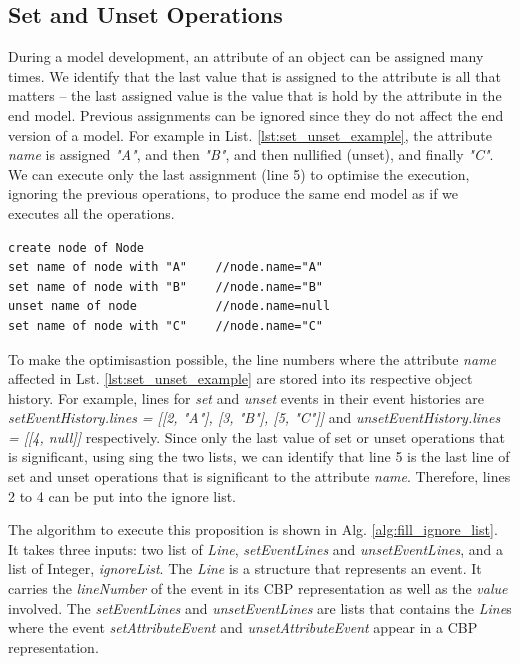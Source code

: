 \documentclass[sigconf]{acmart}
\begin{document}
\subsection{Set and Unset Operations}
\label{subsec:set_and_unset_operations}
During a model development, an attribute of an object can be assigned many times. We identify that the last value that is assigned to the attribute is all that matters -- the last assigned value is the value that is hold by the attribute in the end model. Previous assignments can be ignored since they do not affect the end version of a model. For example in List. \ref{lst:set_unset_example}, the attribute \emph{name} is assigned \emph{"A"}, and then \emph{"B"}, and then nullified (unset), and finally \emph{"C"}. We can execute only the last assignment (line 5) to optimise the execution, ignoring the previous operations, to produce the same end model as if we executes all the operations. 

\begin{lstlisting}[style=eol,caption={Example of CBP representation of \emph{name} attribute assignments.},label=lst:set_unset_example]
create node of Node
set name of node with "A"    //node.name="A"    
set name of node with "B"    //node.name="B"
unset name of node           //node.name=null
set name of node with "C"    //node.name="C"
\end{lstlisting}

To make the optimisastion possible, the line numbers where the attribute \emph{name} affected in Lst. \ref{lst:set_unset_example} are stored into its respective object history.  For example, lines for \emph{set} and \emph{unset} events in their event histories are \emph{setEventHistory.lines = [[2, "A"], [3, "B"], [5, "C"]]} and \emph{unsetEventHistory.lines = [[4, null]]} respectively. Since only the last value of set or unset operations that is significant, using sing the two lists, we can identify that line 5 is the last line of set and unset operations that is significant to the attribute \emph{name}. Therefore, lines 2 to 4 can be put into the ignore list.  

The algorithm to execute this proposition is shown in Alg. \ref{alg:fill_ignore_list}. It takes three inputs: two list of \emph{Line}, \emph{setEventLines} and \emph{unsetEventLines}, and a list of Integer, \emph{ignoreList}. The \emph{Line} is a structure that represents an event. It carries the \emph{lineNumber} of the event in its CBP representation as well as the \emph{value} involved. The \emph{setEventLines} and \emph{unsetEventLines} are lists that contains the \emph{Line}s where the event \emph{setAttributeEvent} and \emph{unsetAttributeEvent} appear in a CBP representation. 
\end{document}
